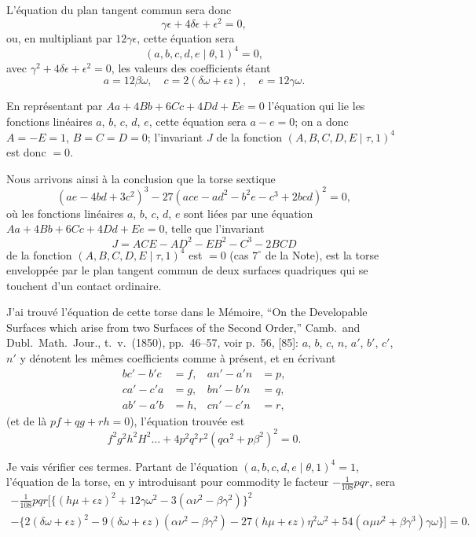 \documentclass[11pt,a4paper]{article}
\begin{document}
L'\'{e}quation du plan tangent commun sera donc
\[
\gamma\epsilon + 4\delta\epsilon + \epsilon^2 = 0,
\]
ou, en multipliant par $12\gamma\epsilon$, cette \'{e}quation sera
\[
(a, b, c, d, e \mid \theta, 1)^4 = 0,
\]
avec $\gamma^2 + 4\delta\epsilon + \epsilon^2 = 0$,
les valeurs des coefficients \'{e}tant
\[
a = 12\beta\omega,\quad c = 2(\delta\omega + \epsilon z),\quad e = 12\gamma\omega.
\]

En repr\'{e}sentant par $Aa + 4Bb + 6Cc + 4Dd + Ee = 0$ l'\'{e}quation qui lie les fonctions lin\'{e}aires $a$, $b$, $c$, $d$, $e$, cette \'{e}quation sera $a - e = 0$; on a donc $A = -E = 1$, $B = C = D = 0$; l'invariant $J$ de la fonction $(A, B, C, D, E \mid \tau, 1)^4$ est donc $= 0$.

Nous arrivons ainsi \`{a} la conclusion que la torse sextique
\[
(ae - 4bd + 3c^2)^3 - 27(ace - ad^2 - b^2e - c^3 + 2bcd)^2 = 0,
\]
o\`{u} les fonctions lin\'{e}aires $a$, $b$, $c$, $d$, $e$ sont li\'{e}es par une \'{e}quation $Aa + 4Bb + 6Cc + 4Dd + Ee = 0$, telle que l'invariant
\[
J = ACE - AD^2 - EB^2 - C^3 - 2BCD
\]
de la fonction $(A, B, C, D, E \mid \tau, 1)^4$ est $= 0$ (cas $7^\circ$ de la Note), est la torse envelopp\'{e}e par le plan tangent commun de deux surfaces quadriques qui se touchent d'un contact ordinaire.

J'ai trouv\'{e} l'\'{e}quation de cette torse dans le M\'{e}moire, ``On the Developable Surfaces which arise from two Surfaces of the Second Order,'' Camb.\ and Dubl.\ Math.\ Jour., t.\ v.\ (1850), pp.\ 46--57, voir p.\ 56, [85]: $a$, $b$, $c$, $n$, $a'$, $b'$, $c'$, $n'$ y d\'{e}notent les m\^{e}mes coefficients comme \`{a} pr\'{e}sent, et en \'{e}crivant
\begin{align*}
bc' - b'c &= f, & an' - a'n &= p, \\
ca' - c'a &= g, & bn' - b'n &= q, \\
ab' - a'b &= h, & cn' - c'n &= r,
\end{align*}
(et de l\`{a} $pf + qg + rh = 0$), l'\'{e}quation trouv\'{e}e est
\[
f^2 g^2 h^2 H^2 \ldots + 4p^2 q^2 r^2 (q\alpha^2 + p\beta^2)^2 = 0.
\]

Je vais v\'{e}rifier ces termes. Partant de l'\'{e}quation $(a, b, c, d, e \mid \theta, 1)^4 = 1$, l'\'{e}quation de la torse, en y introduisant pour commodity le facteur $-\tfrac{1}{108}pqr$, sera
\begin{multline*}
-\tfrac{1}{108}pqr \bigl[\{(h\mu + \epsilon z)^2 + 12\gamma\omega^2 - 3(\alpha\nu^2 - \beta\gamma^2)\}^2 \\
- \{2(\delta\omega + \epsilon z)^2 - 9(\delta\omega + \epsilon z)(\alpha\nu^2 - \beta\gamma^2) - 27(h\mu + \epsilon z)\eta^2\omega^2 + 54(\alpha\mu\nu^2 + \beta\gamma^3)\gamma\omega\}\bigr] = 0.
\end{multline*}
\end{document}
